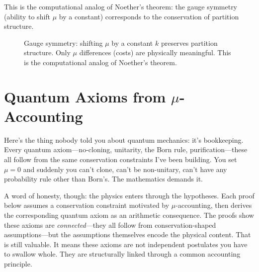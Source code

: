 This is the computational analog of Noether's theorem: the gauge symmetry (ability to shift $\mu$ by a constant) corresponds to the conservation of partition structure.

\begin{figure}[H]
\centering
{}
\caption{Gauge symmetry: shifting $\mu$ by a constant $k$ preserves partition structure. Only $\mu$ differences (costs) are physically meaningful. This is the computational analog of Noether's theorem.}
\label{fig:gauge-symmetry}
\end{figure}

\section{Quantum Axioms from $\mu$-Accounting}

Here's the thing nobody told you about quantum mechanics: it's bookkeeping. Every quantum axiom---no-cloning, unitarity, the Born rule, purification---these all follow from the same conservation constraints I've been building. You set $\mu = 0$ and suddenly you can't clone, can't be non-unitary, can't have any probability rule other than Born's. The mathematics demands it.

A word of honesty, though: the physics enters through the hypotheses. Each proof below assumes a conservation constraint motivated by $\mu$-accounting, then derives the corresponding quantum axiom as an arithmetic consequence. The proofs show these axioms are \textit{connected}---they all follow from conservation-shaped assumptions---but the assumptions themselves encode the physical content. That is still valuable. It means these axioms are not independent postulates you have to swallow whole. They are structurally linked through a common accounting principle.

